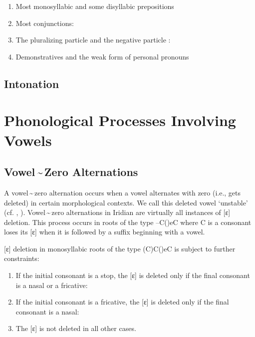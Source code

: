 \begin{enumerate}[noitemsep,label=(\alph*)]
	\item Most monosyllabic and some disyllabic prepositions
	\item Most conjunctions:
	\item The pluralizing particle  and the negative particle : 
	\item Demonstratives and the weak form of personal pronouns
\end{enumerate}

\subsection{Intonation}

\section{Phonological Processes Involving Vowels}

\subsection{Vowel\,\sim\,Zero Alternations}

A vowel\,\sim\,zero alternation occurs when a vowel alternates with zero (i.e., gets deleted) in certain morphological contexts. We call this deleted vowel `unstable' (cf. \cite{siptar2000}, \cite{gussmann2007}). Vowel\,\sim\,zero alternations in Iridian are virtually all instances of [ɛ] deletion. This process occurs in roots of the type --C()eC where C is a consonant loses its [ɛ] when it is followed by a suffix beginning with a vowel.

\ex
{}
\xe

[ɛ] deletion in monosyllabic roots of the type (C)C()eC is subject to further constraints:

\begin{enumerate}
	\item If the initial consonant is a stop, the [ɛ] is deleted only if the final consonant is a nasal or a fricative:\\

	\item If the initial consonant is a fricative, the [ɛ] is deleted only if the final consonant is a nasal:\\

	\item The [ɛ] is not deleted in all other cases.
	 
\end{enumerate}

